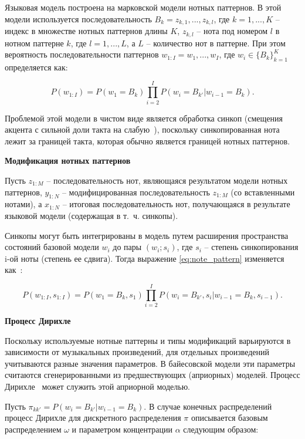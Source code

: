 Языковая модель построена на марковской модели нотных паттернов. В этой модели используется последовательность $B_k = z_{k,1}, ..., z_{k,l}$, где $k = 1, ..., K$ -- индекс в множестве нотных паттернов длины $K$, $z_{k,l}$ -- нота под номером $l$ в нотном паттерне $k$, где $l = 1, ..., L$, а $L$ -- количество нот в паттерне. При этом вероятность последовательности паттернов $w_{1:I} = w_1, ..., w_I$, где $w_i \in \{B_k\}_{k=1}^K$ определяется как:

\begin{equation}\label{eq:note_pattern}
	P(w_{1:I}) = P(w_1 = B_k) \prod_{i=2}^I P(w_i=B_{k'}|w_{i-1}=B_k).
\end{equation}

Проблемой этой модели в чистом виде является обработка синкоп (смещения акцента с сильной доли такта на слабую~\cite{syncope}), поскольку синкопированная нота лежит за границей такта, которая обычно является границей нотных паттернов.

\textbf{Модификация нотных паттернов}

Пусть $z_{1:M}$ -- последовательность нот, являющаяся результатом модели нотных паттернов, $y_{1:N}$ -- модифицированная последовательность $z_{1:M}$ (со вставленными нотами), а $x_{1:N}$ -- итоговая последовательность нот, получающаяся в результате языковой модели (содержащая в т.~ч. синкопы).

Синкопы могут быть интегрированы в модель путем расширения пространства состояний базовой модели $w_i$ до пары $(w_i; s_i)$, где $s_i$ -- степень синкопирования i-ой ноты (степень ее сдвига). Тогда выражение \ref{eq:note_pattern} изменяется как~\cite{bayesian}:

\begin{equation}
	P(w_{1:I}, s_{1:I}) = P(w_1 = B_k, s_1) \prod_{i=2}^I P(w_i=B_{k'}, s_i|w_{i-1}=B_k, s_{i-1}).
\end{equation}

\textbf{Процесс Дирихле}

Поскольку используемые нотные паттерны и типы модификаций варьируются в зависимости от музыкальных произведений, для отдельных произведений учитываются разные значения параметров. В байесовской модели эти параметры считаются сгенерированными из предшествующих (априорных) моделей. Процесс Дирихле~\cite{dirichlet} может служить этой априорной моделью.

Пусть $\pi_{kk'} = P(w_i=B_{k'}|w_{i-1}=B_k)$. В случае конечных распределений процесс Дирихле для дискретного распределения $\pi$ описывается базовым распределением $\omega$ и параметром концентрации $\alpha$ следующим образом:

